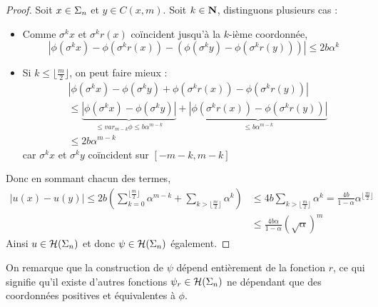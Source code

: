 \begin{proof}
    Soit $x \in \Sigma_n$ et $y \in C(x, m)$. Soit $k \in \mathbf N$, distinguons plusieurs cas :
    \begin{itemize}
      \item Comme $\sigma^kx$ et $\sigma^kr(x)$ coïncident jusqu'à la $k$-ième coordonnée,
	$$\left|\phi(\sigma^kx) - \phi(\sigma^kr(x)) - (\phi(\sigma^ky) - \phi(\sigma^kr(y)))\right|
	      \leq 2b\alpha^k$$
      \item Si $k \leq \lfloor\frac m 2\rfloor$, on peut faire mieux :
	\begin{align*}
	  &\left|\phi(\sigma^kx) - \phi(\sigma^ky) + \phi(\sigma^kr(x)) - \phi(\sigma^kr(y)) \right| \\
	  &\leq \underbrace{\left|\phi(\sigma^kx) - \phi(\sigma^ky)\right|}_{\leq var_{m-k}\phi \leq b\alpha^{m-k}}
	  + \underbrace{\left|\phi(\sigma^kr(x)) - \phi(\sigma^kr(y))\right|}_{\leq b\alpha^{m-k}} \\
	  &\leq 2b\alpha^{m-k}
	\end{align*}
	car $\sigma^kx$ et $\sigma^ky$ coïncident sur $[-m - k, m - k]$
    \end{itemize}
    Donc en sommant chacun des termes,
    \begin{align*}
      \left|u(x) - u(y)\right|
	    \leq 2b\left(\sum_{k=0}^{\lfloor\frac m 2\rfloor}{\alpha^{m - k}} + \sum_{k > \lfloor \frac m 2 \rfloor}{\alpha^k}\right)
	    &\leq 4b\sum_{k > \lfloor \frac m 2 \rfloor}{\alpha^k} = \frac{4b}{1-\alpha}\alpha^{\lfloor\frac m 2\rfloor} \\
	    &\leq \frac{4b\alpha}{1 - \alpha}(\sqrt{\alpha})^m
    \end{align*}
    Ainsi $u \in \mathcal{H} (\Sigma_{n})$ et donc $\psi \in \mathcal{H} (\Sigma_{n})$ également.
  \end{proof}

  \begin{remark}
    On remarque que la construction de $\psi$ dépend entièrement de la fonction $r$, ce qui signifie qu'il existe d'autres fonctions $\psi_r \in \mathcal{H} (\Sigma_{n})$
    ne dépendant que des coordonnées positives et équivalentes à $\phi$.
  \end{remark}
